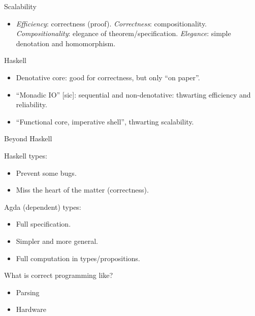 \documentclass[aspectratio=169]{beamer}
\begin{document}
\nc\pitem{\pause\item}

\begin{frame}{Scalability}
\begin{itemize}\itemsep3ex
\item \emph{Efficiency}: correctness (proof).
\pitem \emph{Correctness}: compositionality.
\pitem \emph{Compositionality}: elegance of theorem/specification.
\pitem \emph{Elegance}: simple denotation and homomorphism.
\end{itemize}
\end{frame}

\begin{frame}{Haskell}
\begin{itemize}\itemsep3ex
\item Denotative core: good for correctness, but only ``on paper''.
\item ``Monadic IO'' [sic]: sequential and non-denotative: thwarting efficiency and reliability.
\item ``Functional core, imperative shell'', thwarting scalability.
\end{itemize}
\end{frame}

\begin{frame}{Beyond Haskell}

Haskell types:
\begin{itemize}\itemsep3ex
\item Prevent some bugs.
\item Miss the heart of the matter (correctness).
\end{itemize}

\pause
\vspace{4ex}

Agda (dependent) types:
\begin{itemize}\itemsep3ex
\item Full specification.
\item Simpler and more general.
\item Full computation in types/propositions.
\end{itemize}
\end{frame}

\begin{frame}{What is correct programming like?}

\begin{itemize}\itemsep3ex
\item Parsing
\item Hardware
\end{itemize}


\end{frame}
\end{document}
